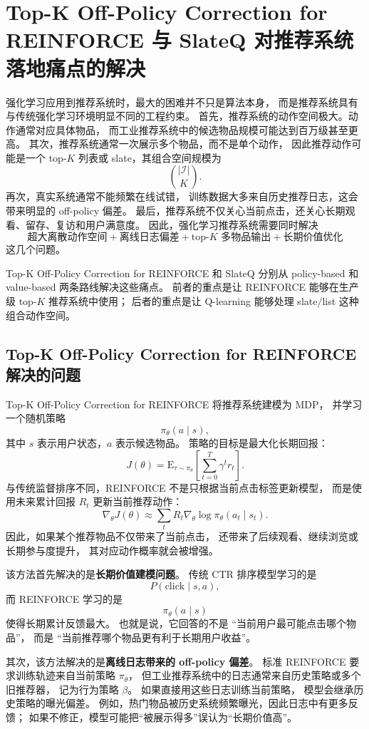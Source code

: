 \documentclass[11pt]{ctexart}
\begin{document}
\section{Top-K Off-Policy Correction for REINFORCE 与 SlateQ 对推荐系统落地痛点的解决}

强化学习应用到推荐系统时，最大的困难并不只是算法本身，
而是推荐系统具有与传统强化学习环境明显不同的工程约束。
首先，推荐系统的动作空间极大。动作通常对应具体物品，
而工业推荐系统中的候选物品规模可能达到百万级甚至更高。
其次，推荐系统通常一次展示多个物品，而不是单个动作，
因此推荐动作可能是一个 top-$K$ 列表或 slate，其组合空间规模为
\[
\binom{|\mathcal{I}|}{K}.
\]
再次，真实系统通常不能频繁在线试错，
训练数据大多来自历史推荐日志，这会带来明显的 off-policy 偏差。
最后，推荐系统不仅关心当前点击，还关心长期观看、留存、复访和用户满意度。
因此，强化学习推荐系统需要同时解决
\[
\text{超大离散动作空间}
+
\text{离线日志偏差}
+
\text{top-}K\text{ 多物品输出}
+
\text{长期价值优化}
\]
这几个问题。

Top-K Off-Policy Correction for REINFORCE 和 SlateQ 分别从 policy-based
和 value-based 两条路线解决这些痛点。
前者的重点是让 REINFORCE 能够在生产级 top-$K$ 推荐系统中使用；
后者的重点是让 Q-learning 能够处理 slate/list 这种组合动作空间。

\subsection{Top-K Off-Policy Correction for REINFORCE 解决的问题}

Top-K Off-Policy Correction for REINFORCE 将推荐系统建模为 MDP，
并学习一个随机策略
\[
\pi_{\theta}(a\mid s),
\]
其中 $s$ 表示用户状态，$a$ 表示候选物品。
策略的目标是最大化长期回报：
\[
J(\theta)
=
\mathrm{E}_{\tau\sim \pi_{\theta}}
\left[
\sum_{t=0}^{T}\gamma^t r_t
\right].
\]
与传统监督排序不同，REINFORCE 不是只根据当前点击标签更新模型，
而是使用未来累计回报 $R_t$ 更新当前推荐动作：
\[
\nabla_{\theta}J(\theta)
\approx
\sum_t
R_t
\nabla_{\theta}\log \pi_{\theta}(a_t\mid s_t).
\]
因此，如果某个推荐物品不仅带来了当前点击，
还带来了后续观看、继续浏览或长期参与度提升，
其对应动作概率就会被增强。

该方法首先解决的是\textbf{长期价值建模问题}。
传统 CTR 排序模型学习的是
\[
P(\text{click}\mid s,a),
\]
而 REINFORCE 学习的是
\[
\pi_{\theta}(a\mid s)
\]
使得长期累计反馈最大。
也就是说，它回答的不是
``当前用户最可能点击哪个物品''，
而是
``当前推荐哪个物品更有利于长期用户收益''。

其次，该方法解决的是\textbf{离线日志带来的 off-policy 偏差}。
标准 REINFORCE 要求训练轨迹来自当前策略 $\pi_{\theta}$，
但工业推荐系统中的日志通常来自历史策略或多个旧推荐器，
记为行为策略 $\beta$。
如果直接用这些日志训练当前策略，
模型会继承历史策略的曝光偏差。
例如，热门物品被历史系统频繁曝光，因此日志中有更多反馈；
如果不修正，模型可能把``被展示得多''误认为``长期价值高''。
\end{document}
